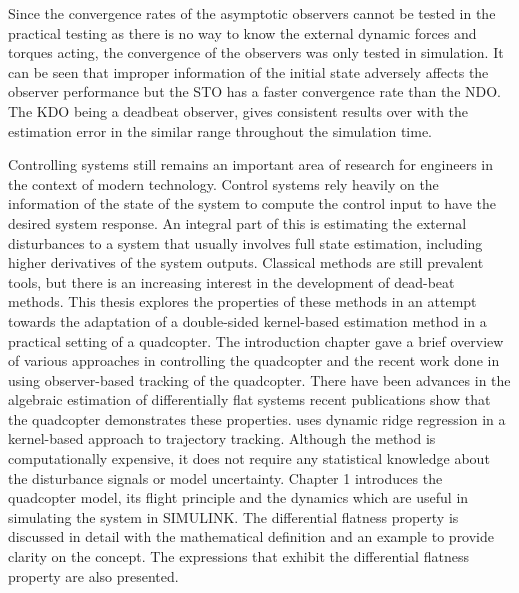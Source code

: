 \documentclass[letterpaper%
, twoside%
, 12pt%
,memoire%
, english%
,creativecommons,hyperref%
]{thETS}
\begin{document}
Since the convergence rates of the asymptotic observers cannot be tested in the practical testing as there is no way to know the external dynamic forces and torques acting, the convergence of the observers was only tested in simulation. It can be seen that improper information of the initial state adversely affects the observer performance but the STO has a faster convergence rate than the NDO. The KDO being a deadbeat observer, gives consistent results over with the estimation error in the similar range throughout the simulation time.

\begin{conclusion}
Controlling systems still remains an important area of research for engineers in the context of modern technology. Control systems rely heavily on the information of the state of the system to compute the control input to have the desired system response. An integral part of this is estimating the external disturbances to a system that usually involves full state estimation, including higher derivatives of the system outputs. Classical methods are still prevalent tools, but there is an increasing interest in the development of dead-beat methods. This thesis explores the properties of these methods in an attempt towards the adaptation of a double-sided kernel-based estimation method in a practical setting of a quadcopter. The introduction chapter gave a brief overview of various approaches in controlling the quadcopter and the recent work done in using observer-based tracking of the quadcopter. There have been advances in the algebraic estimation of differentially flat systems recent publications show that the quadcopter demonstrates these properties. \citep{RN118} uses dynamic ridge regression in a kernel-based approach to trajectory tracking. Although the method is computationally expensive, it does not require any statistical knowledge about the disturbance signals or model uncertainty. 
Chapter 1 introduces the quadcopter model, its flight principle and the dynamics which are useful in simulating the system in SIMULINK. The differential flatness property is discussed in detail with the mathematical definition and an example to provide clarity on the concept. The expressions that exhibit the differential flatness property are also presented.


\end{conclusion}
\end{document}
